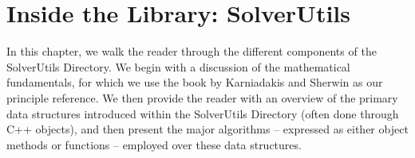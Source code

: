 
%

%



\chapter{Inside the Library: SolverUtils}

In this chapter, we walk the reader through the different components of the SolverUtils Directory.
We begin with a discussion of the mathematical fundamentals, for which we use the book
by Karniadakis and Sherwin \cite{KaSh05} as our principle reference.  We then provide
the reader with an overview of the primary data structures introduced within the
SolverUtils Directory (often done through C++ objects), and then present the major 
algorithms -- expressed as either object methods or functions -- employed over these data structures.  


%

%



